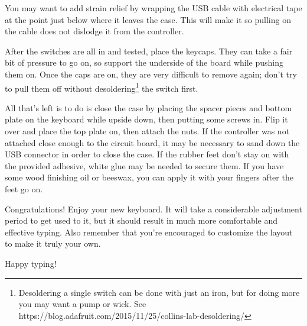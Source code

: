 \documentclass[landscape,twocolumn]{article}
\begin{document}
\vspace{1em}

You may want to add strain relief by wrapping the USB cable with
electrical tape at the point just below where it leaves the case. This
will make it so pulling on the cable does not dislodge it from the
controller.

\vspace{1em}

After the switches are all in and tested, place the keycaps. They can
take a fair bit of pressure to go on, so support the underside of the
board while pushing them on. Once the caps are on, they are very
difficult to remove again; don't try to pull them off without
desoldering\footnote{Desoldering a single switch can be done with just
  an iron, but for doing more you may want a pump or wick. See
  https://blog.adafruit.com/2015/11/25/collins-lab-desoldering/} the
switch first.

\vspace{1em}

All that's left is to do is close the case by placing the spacer
pieces and bottom plate on the keyboard while upside down, then
putting some screws in. Flip it over and place the top plate on, then
attach the nuts. If the controller was not attached close enough to
the circuit board, it may be necessary to sand down the USB connector
in order to close the case. If the rubber feet don't stay on with the
provided adhesive, white glue may be needed to secure them. If you
have some wood finishing oil or beeswax, you can apply it with your
fingers after the feet go on.

\vspace{1em}

Congratulations! Enjoy your new keyboard. It will take a
considerable adjustment period to get used to it, but it should result
in much more comfortable and effective typing. Also remember that
you're encouraged to customize the layout to make it truly your
own.

\vspace{1em}

Happy typing!
\end{document}
